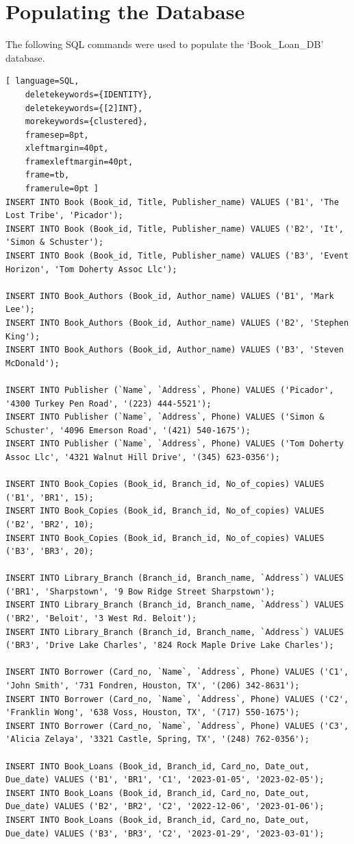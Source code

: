 \documentclass{article}
\begin{document}
\newpage
\section{Populating the Database}

The following SQL commands were used to populate the `Book\_Loan\_DB' database.

\begin{lstlisting}[ language=SQL,
    deletekeywords={IDENTITY},
    deletekeywords={[2]INT},
    morekeywords={clustered},
    framesep=8pt,
    xleftmargin=40pt,
    framexleftmargin=40pt,
    frame=tb,
    framerule=0pt ]
INSERT INTO Book (Book_id, Title, Publisher_name) VALUES ('B1', 'The Lost Tribe', 'Picador');
INSERT INTO Book (Book_id, Title, Publisher_name) VALUES ('B2', 'It', 'Simon & Schuster');
INSERT INTO Book (Book_id, Title, Publisher_name) VALUES ('B3', 'Event Horizon', 'Tom Doherty Assoc Llc');

INSERT INTO Book_Authors (Book_id, Author_name) VALUES ('B1', 'Mark Lee');
INSERT INTO Book_Authors (Book_id, Author_name) VALUES ('B2', 'Stephen King');
INSERT INTO Book_Authors (Book_id, Author_name) VALUES ('B3', 'Steven McDonald');

INSERT INTO Publisher (`Name`, `Address`, Phone) VALUES ('Picador', '4300 Turkey Pen Road', '(223) 444-5521');
INSERT INTO Publisher (`Name`, `Address`, Phone) VALUES ('Simon & Schuster', '4096 Emerson Road', '(421) 540-1675');
INSERT INTO Publisher (`Name`, `Address`, Phone) VALUES ('Tom Doherty Assoc Llc', '4321 Walnut Hill Drive', '(345) 623-0356');

INSERT INTO Book_Copies (Book_id, Branch_id, No_of_copies) VALUES ('B1', 'BR1', 15);
INSERT INTO Book_Copies (Book_id, Branch_id, No_of_copies) VALUES ('B2', 'BR2', 10);
INSERT INTO Book_Copies (Book_id, Branch_id, No_of_copies) VALUES ('B3', 'BR3', 20);

INSERT INTO Library_Branch (Branch_id, Branch_name, `Address`) VALUES ('BR1', 'Sharpstown', '9 Bow Ridge Street Sharpstown');
INSERT INTO Library_Branch (Branch_id, Branch_name, `Address`) VALUES ('BR2', 'Beloit', '3 West Rd. Beloit');
INSERT INTO Library_Branch (Branch_id, Branch_name, `Address`) VALUES ('BR3', 'Drive Lake Charles', '824 Rock Maple Drive Lake Charles');

INSERT INTO Borrower (Card_no, `Name`, `Address`, Phone) VALUES ('C1', 'John Smith', '731 Fondren, Houston, TX', '(206) 342-8631');
INSERT INTO Borrower (Card_no, `Name`, `Address`, Phone) VALUES ('C2', 'Franklin Wong', '638 Voss, Houston, TX', '(717) 550-1675');
INSERT INTO Borrower (Card_no, `Name`, `Address`, Phone) VALUES ('C3', 'Alicia Zelaya', '3321 Castle, Spring, TX', '(248) 762-0356');

INSERT INTO Book_Loans (Book_id, Branch_id, Card_no, Date_out, Due_date) VALUES ('B1', 'BR1', 'C1', '2023-01-05', '2023-02-05');
INSERT INTO Book_Loans (Book_id, Branch_id, Card_no, Date_out, Due_date) VALUES ('B2', 'BR2', 'C2', '2022-12-06', '2023-01-06');
INSERT INTO Book_Loans (Book_id, Branch_id, Card_no, Date_out, Due_date) VALUES ('B3', 'BR3', 'C2', '2023-01-29', '2023-03-01');
\end{lstlisting}
\end{document}
